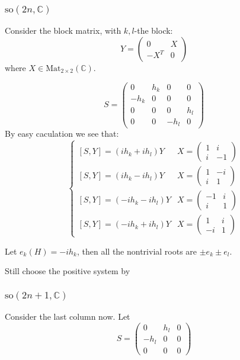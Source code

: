 \documentclass[12pt]{amsart}
\def\Mat{\rm{Mat}}
\def\bC{{\mathbb{C}}}
\def\aso{\mathrm{so}}
\def\Mat{\mathrm{Mat}}
\begin{document}
\subsubsection{$\aso(2n,\bC)$}
Consider the block matrix, with $k,l$-the block:
\[
Y = \begin{pmatrix}
  0  & X \\
  -X^T & 0  
\end{pmatrix}
\]
where $X\in \Mat_{2\times 2}(\bC)$.

\[
S = \begin{pmatrix}
   0 & h_k &   0 & 0 \\
-h_k & 0   &   0 & 0 \\
   0 & 0   &   0 & h_l \\
   0 & 0   & -h_l&  0 
\end{pmatrix}
\]
By easy caculation we see that:
\[
\begin{cases}
[S,Y] = (ih_k+ih_l) Y
& X = \begin{pmatrix}
  1 & i \\
  i & -1
\end{pmatrix} \\
[S,Y] = (ih_k-ih_l) Y
& X = \begin{pmatrix}
  1 & -i \\
  i & 1
\end{pmatrix} \\
[S,Y] = (-ih_k-ih_l) Y
& X = \begin{pmatrix}
  -1 & i \\
  i & 1
\end{pmatrix} \\
[S,Y] = (-ih_k+ih_l) Y
& X = \begin{pmatrix}
   1 & i \\
  -i & 1
\end{pmatrix} 
\end{cases}
\]

Let $e_k(H) = -ih_k$, then all the nontrivial roots are $\pm e_k \pm e_l$.

Still choose the positive system by 
\subsubsection{$\aso(2n+1, \bC)$}

Consider the last column now. Let
\[
S = \begin{pmatrix}
  0 & h_l & 0 \\
  -h_l & 0 & 0 \\
  0 & 0 &0 
\end{pmatrix}
\]
\end{document}
